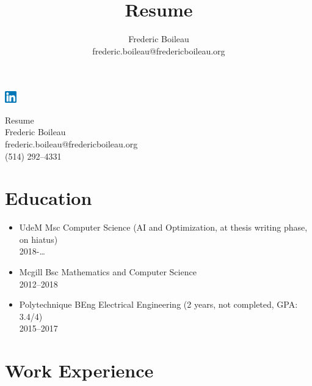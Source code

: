\documentclass{article}
\title{Resume}
\author{Frederic Boileau\\[1em] frederic.boileau@fredericboileau.org}
\begin{document}
\pagestyle{empty} \null\hfill\href{https://www.linkedin.com/in/frederic-boileau/}{\includegraphics[width=5mm]{linkedin.png}}
\begin{center}
  Resume\\
  Frederic Boileau\\
  frederic.boileau@fredericboileau.org\\
  (514) 292--4331
\end{center}

\section*{Education}

\begin{itemize}
  \item UdeM Msc Computer Science (AI and Optimization, at thesis writing phase, on hiatus)\\ 2018-\ldots
  \item Mcgill Bsc Mathematics and Computer Science\\
    2012--2018
  \item Polytechnique BEng Electrical Engineering (2 years, not completed, GPA: 3.4/4)\\ 2015--2017
\end{itemize}


\section*{Work Experience}
\end{document}
